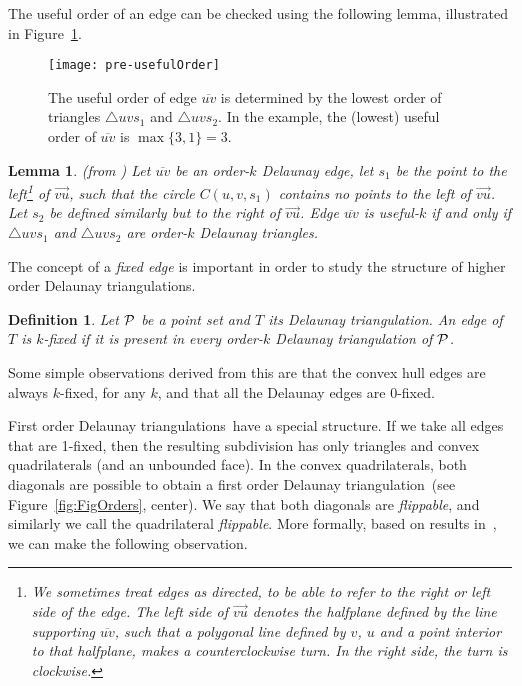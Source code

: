 \documentclass {journal}
\newtheorem {lemma} {Lemma}
\newtheorem {definition} {Definition}
\newcommand{\Pts}{\cal P}
\newcommand {\hodts}{higher order Delaunay triangulations}
\newcommand {\fodt}{first order Delaunay triangulation}
\newcommand {\Fodts}{First order Delaunay triangulations}
\begin{document}
The useful order of an edge can be checked using the following lemma, illustrated in Figure~\ref{fig:pre-usefulOrder}.


\begin{figure}[tb]
\centering
\texttt{[image: pre-usefulOrder]}
\caption{The useful order of edge $\overline{uv}$ is determined by
the lowest order of triangles $\triangle uvs_1$ and $\triangle
uvs_2$. In the example, the (lowest) useful order of
$\overline{uv}$ is $\max\{3,1\}=3$.} \label{fig:pre-usefulOrder}
\end{figure}

\begin{lemma}
  \label {lem:useful_edge_test}
      (from \cite{ghk-hodt-02}) Let $\overline{uv}$ be an order-$k$ Delaunay edge, let $s_1$ be the point to the left\footnote{
      We sometimes treat edges as directed, to be able to refer to the right or left side of the edge.
      The \emph{left} side of $\overrightarrow{vu}$ denotes the halfplane defined by the line
      supporting $\overline{uv}$, such that
       a polygonal line defined by $v$, $u$ and a point interior to that halfplane, makes a counterclockwise turn.
       In the \emph{right} side, the turn is clockwise.}
       of $\overrightarrow{vu}$, such that the circle $C(u,v,s_1)$ contains no points to the left of $\overrightarrow{vu}$.
       Let $s_2$ be defined similarly but to the right of $\overrightarrow{vu}$. Edge $\overline{uv}$ is
       useful-$k$ if and only if $\triangle{uvs_1}$ and $\triangle{uvs_2}$ are order-$k$ Delaunay triangles.
\end{lemma}

The concept of a \emph{fixed edge} is important in order to study
the structure of \hodts.

\begin{definition}
Let $\Pts$ be a point set and $T$ its Delaunay triangulation. An
edge of $T$ is \emph{$k$-fixed} if it is present in every
order-$k$ Delaunay triangulation of $\Pts$.
\end{definition}

Some simple observations derived from this are that the convex hull edges are always $k$-fixed, for any $k$, and that all the Delaunay edges are $0$-fixed.


\Fodts\ have a special structure.
  If we take all edges that are 1-fixed, then the resulting subdivision has only triangles and
  convex quadrilaterals (and an unbounded face). In the convex quadrilaterals,
  both diagonals are possible to obtain a \fodt\ (see Figure~\ref{fig:FigOrders}, center).
  We say that both diagonals are \emph{flippable}, and similarly we call the quadrilateral \emph{flippable}.
More formally, based on results in~\cite{ghk-hodt-02}, we can make the following observation.
\end{document}
